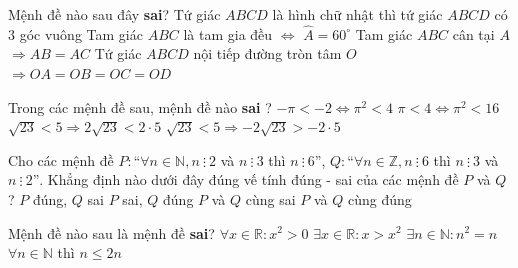 \begin{ex}%
	Mệnh đề nào sau đây  \textbf{sai}?
	 \choice
		{Tứ giác $ABCD$ là hình chữ nhật thì tứ giác $ABCD$ có $3$ góc vuông} 
		{\True Tam giác $ABC$ là tam  gia đều $\Leftrightarrow$ $\widehat{A}=60^{\circ}$}
		{Tam giác $ABC$ cân tại  $A$ $\Rightarrow AB=AC$}
		{Tứ giác $ABCD$ nội  tiếp đường tròn tâm $O$ $\Rightarrow OA=OB=OC=OD$}
\end{ex}

\begin{ex}%
	Trong  các mệnh đề sau, mệnh đề nào \textbf{sai} ?
	\choice 
		 {\True $-\pi <-2\Leftrightarrow \pi^2<4$}
		{$\pi <4\Leftrightarrow {{\pi  }^2}<16$ }
		{$\sqrt{23}<5\Rightarrow 2\sqrt{23}<2\cdot5$ } 
		 {$\sqrt{23}<5\Rightarrow -2\sqrt{23}>-2\cdot5$}
\end{ex}

\begin{ex}%
	Cho  các mệnh đề $P: “\forall n\in \mathbb{N},n~\vdots ~2$ và $n~\vdots ~3$ thì $n~\vdots ~ 6”$, $Q: “\forall n\in \mathbb{Z},n~\vdots ~6$ thì $n~\vdots ~3$ và $n~\vdots ~2”$.
	Khẳng định nào dưới đây đúng vế tính đúng - sai của các mệnh đề $P$  và $Q$?
	 \choice
		{$P$  đúng, $Q$ sai}
		 {$P$ sai, $Q$ đúng}
		{$P$ và $Q$ cùng  sai}
		{\True $P$ và  $Q$ cùng đúng}
\end{ex}

\begin{ex}%
	Mệnh đề nào sau là mệnh đề  \textbf{sai}?
	\choice 
		{\True $\forall x\in \mathbb{R}\colon  x^2>0$}
		{$\exists x\in \mathbb{R}\colon x>x^2$} 
		 {$\exists n\in \mathbb{N}\colon n^2=n$}
		{$\forall n\in \mathbb{N}$ thì $n\leqslant  2n$}
\end{ex}

